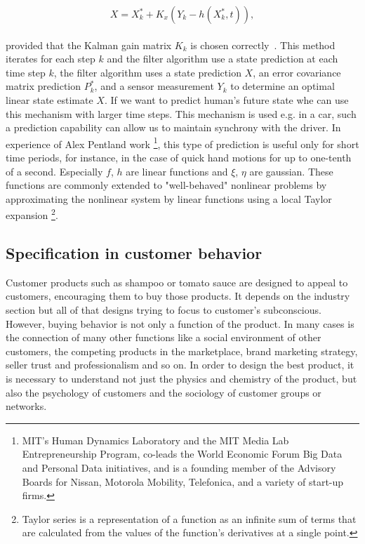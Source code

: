 \begin{equation} \label{eq:5}
X = X_{k}^{*} + K_x(Y_k - h(X_{k}^{*},t)),
\end{equation}
\\
provided that the Kalman gain matrix $K_k$ is chosen correctly~\cite{kalman}.
This method iterates for each step $k$ and the filter algorithm use a state prediction at each time step $k$,
the filter algorithm uses a state prediction $X$, an error covariance matrix prediction $P_k^*$,
and a sensor measurement $Y_k$ to determine an optimal linear state estimate $X$.
If we want to predict human's future state whe can use this mechanism with larger time steps.
This mechanism is used e.g. in a car, such a prediction capability can allow us to maintain synchrony with the driver.
In experience of Alex Pentland work \footnote{MIT's Human Dynamics Laboratory and the MIT Media Lab Entrepreneurship
Program, co-leads the World Economic Forum Big Data and Personal Data initiatives, and is a founding member
of the Advisory Boards for Nissan, Motorola Mobility, Telefonica, and a variety of start-up firms.}, this type of prediction
is useful only for short time periods, for instance, in the case of quick hand motions for up to one-tenth of a second.
Especially $f$, $h$ are linear functions and $\xi$, $\eta$ are gaussian.
These functions are commonly extended to "well-behaved" nonlinear problems by approximating the nonlinear system by linear functions
using a local Taylor expansion \footnote{Taylor series is a representation of a function as an infinite sum of terms that are calculated from
the values of the function's derivatives at a single point.}.

\subsection{Specification in customer behavior} \label{subsec:specification}
Customer products such as shampoo or tomato sauce are designed to appeal to customers, encouraging them to buy those products.
It depends on the industry section but all of that designs trying to focus to customer's subconscious.
However, buying behavior is not only a function of the product.
In many cases is the connection of many other functions like a social environment of other customers, the competing
products in the marketplace, brand marketing strategy, seller trust and professionalism and so on.
In order to design the best product, it is necessary to understand not just the physics and chemistry of the product,
but also the psychology of customers and the sociology of customer groups or networks\cite{patel}.

